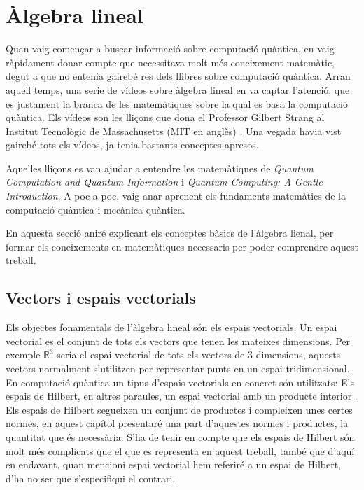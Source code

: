 \chapter{Àlgebra lineal}\label{algebra}
Quan vaig començar a buscar informació sobre computació quàntica, en vaig ràpidament donar compte que necessitava molt més coneixement matemàtic, degut a que no entenia gairebé res dels llibres sobre computació quàntica. Arran aquell temps, una serie de vídeos sobre àlgebra lineal en va captar l’atenció, que es justament la branca de les matemàtiques sobre la qual es basa la computació quàntica. Els vídeos son les lliçons que dona el Professor Gilbert Strang al Institut Tecnològic de Massachusetts (MIT en anglès) \cite{LA_OCW_strang, LA2_OCW_strang}. Una vegada havia vist gairebé tots els vídeos, ja tenia bastants conceptes apresos. 

Aquelles lliçons es van ajudar a entendre les matemàtiques de \textit{Quantum Computation and Quantum Information} \cite{QCandQI} i \textit{Quantum Computing: A Gentle Introduction}. A poc a poc, vaig anar aprenent els fundaments matemàtics de la computació quàntica i mecànica quàntica.

En aquesta secció aniré explicant els conceptes bàsics de l'àlgebra lienal, per formar els coneixements en matemàtiques necessaris per poder comprendre aquest treball. 

\section{Vectors i espais vectorials}
Els objectes fonamentals de l'àlgebra lineal són els espais vectorials. Un espai vectorial es el conjunt de tots els vectors que tenen les mateixes dimensions. Per exemple  $\mathbb{R}^{3}$ seria el espai vectorial de tots els vectors de 3 dimensions, aquests vectors normalment s'utilitzen per representar punts en un espai tridimensional. En computació quàntica un tipus d'espais vectorials en concret són utilitzats: Els espais de Hilbert, en altres paraules, un espai vectorial amb un producte interior \cite{QCandQI:GramSchmidt}. Els espais de Hilbert segueixen un conjunt de productes i compleixen unes certes normes, en aquest capítol presentaré una part d'aquestes normes i productes, la quantitat que és necessària. S'ha de tenir en compte que els espais de Hilbert són molt més complicats que el que es representa en aquest treball, també que d'aquí en endavant, quan mencioni espai vectorial hem referiré a un espai de Hilbert, d'ha no ser que s'especifiqui el contrari. 

